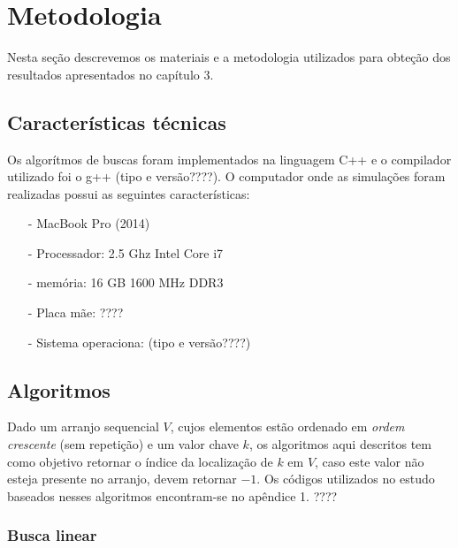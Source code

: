 \chapter{Metodologia}

Nesta seção descrevemos os materiais e a metodologia utilizados para obteção dos resultados apresentados no capítulo 3.

\section{Características técnicas}

Os algorítmos de buscas foram implementados na linguagem C++ e o compilador utilizado foi o g++ (tipo e versão????). O computador onde as simulações foram realizadas possui as seguintes características:
\begin{itemize}
\item[-] MacBook Pro (2014)
\item[-] Processador: 2.5 Ghz Intel Core i7
\item[-] memória: 16 GB 1600 MHz DDR3
\item[-] Placa mãe: ????
\item[-] Sistema operaciona: (tipo e versão????)
\end{itemize}

\section{Algoritmos}

Dado um arranjo sequencial $V$, cujos elementos estão ordenado em {\it ordem crescente} (sem repetição) e um valor chave $k$, os algoritmos aqui descritos tem como objetivo retornar o índice da localização de $k$ em $V$, caso este valor não esteja presente no arranjo, devem retornar $-1$. Os códigos utilizados no estudo baseados nesses algoritmos encontram-se no apêndice 1. ????



\subsection{Busca linear}

